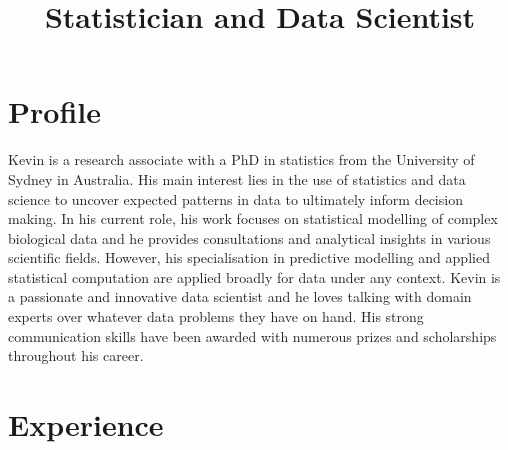 \documentclass[12pt,a4paper,sans]{moderncv} %
\title{Statistician and Data Scientist}
\begin{document}
	
	\makecvtitle %
	
	
	
	
	\section{Profile}
	
	
	Kevin is a research associate with a PhD in statistics from the University of Sydney in Australia. His main interest lies in the use of statistics and data science to uncover expected patterns in data to ultimately inform decision making. In his current role, his work focuses on statistical modelling of complex biological data and he provides consultations and analytical insights in various scientific fields. However, his specialisation in predictive modelling and applied statistical computation are applied broadly for data under any context. Kevin is a passionate and innovative data scientist and he loves talking with domain experts over whatever data problems they have on hand. His strong communication skills have been awarded with numerous prizes and scholarships throughout his career. 
	
	
	\section{Experience}
	
	
\end{document}
